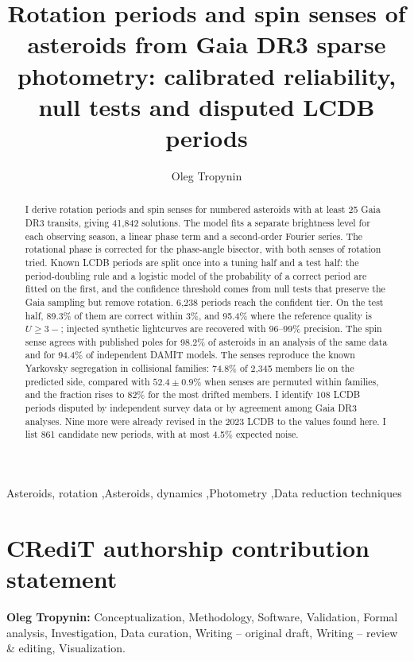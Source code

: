 \documentclass[preprint,12pt,authoryear]{elsarticle}
\begin{document}
\linenumbers

\begin{frontmatter}

\title{Rotation periods and spin senses of asteroids from Gaia DR3 sparse photometry: calibrated reliability, null tests and disputed LCDB periods}

\author{Oleg Tropynin}
\address{Independent researcher, Karaganda, Kazakhstan}

\begin{abstract}
I derive rotation periods and spin senses for numbered asteroids with at least 25 Gaia DR3 transits, giving
41{,}842 solutions. The model fits a separate brightness level for each observing season, a linear phase
term and a second-order Fourier series. The rotational phase is corrected for the phase-angle bisector,
with both senses of rotation tried. Known LCDB periods are split once into a tuning half and a test half:
the period-doubling rule and a logistic model of the probability of a correct period are fitted on the
first, and the confidence threshold comes from null tests that preserve the Gaia sampling but remove
rotation. 6{,}238 periods reach the confident tier. On the test half, 89.3\% of them are correct within 3\%,
and 95.4\% where the reference quality is $U\ge3-$; injected synthetic lightcurves are recovered with
96--99\% precision. The spin sense agrees with published poles for 98.2\% of asteroids in an analysis of the
same data and for 94.4\% of independent DAMIT models. The senses reproduce the known Yarkovsky segregation in
collisional families: 74.8\% of 2{,}345 members lie on the predicted side, compared with $52.4\pm0.9\%$
when senses are permuted within families, and the fraction rises to 82\% for the most drifted members.
I identify 108 LCDB periods disputed by independent survey data or by agreement among Gaia DR3 analyses.
Nine more were already revised in the 2023 LCDB to the values found here. I list 861 candidate new periods,
with at most 4.5\% expected noise.
\end{abstract}

\begin{keyword}
Asteroids, rotation \sep Asteroids, dynamics \sep Photometry \sep Data reduction techniques
\end{keyword}

\end{frontmatter}



\section*{CRediT authorship contribution statement}
\textbf{Oleg Tropynin:} Conceptualization, Methodology, Software, Validation, Formal analysis, Investigation,
Data curation, Writing -- original draft, Writing -- review \& editing, Visualization.
\end{document}
